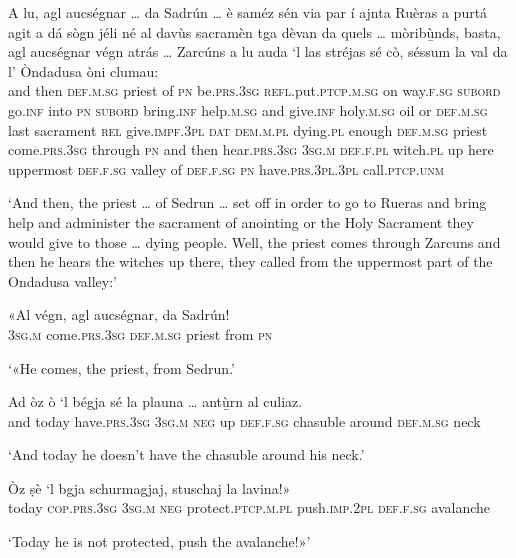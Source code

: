 \begin{linenumbers}
\gll    A lu, agl aucségnar … da Sadrún … è saméz sén via par í ajnta Ruèras a purtá agit a dá sògn jéli né al davùs sacramèn tga dèvan da quels … mòribù̱nds, basta, agl aucségnar végn atrás … Zarcúns a lu auda `l las stréjas sé cò, séssum la val da l' Òndadusa òni clumau:\\
and then \textsc{def.m.sg} priest {} of \textsc{pn} {} be.\textsc{prs.3sg} \textsc{refl.}put.\textsc{ptcp.m.sg} on way.\textsc{f.sg} \textsc{subord} go.\textsc{inf} into \textsc{pn}  \textsc{subord} bring.\textsc{inf} help.\textsc{m.sg} and give.\textsc{inf} holy.\textsc{m.sg} oil or \textsc{def.m.sg} last sacrament \textsc{rel} give.\textsc{impf.3pl} \textsc{dat} \textsc{dem.m.pl} {} dying.\textsc{pl} enough \textsc{def.m.sg} priest come.\textsc{prs.3sg} through {} \textsc{pn} and then hear.\textsc{prs.3sg} \textsc{3sg.m} \textsc{def.f.pl} witch.\textsc{pl} up here uppermost \textsc{def.f.sg} valley of \textsc{def.f.sg}  \textsc{pn} have.\textsc{prs.3pl.3pl} call.\textsc{ptcp.unm}\\
\end{linenumbers}
\medskip
\glt `And then, the priest … of Sedrun … set off in order to go to Rueras and bring help and administer the sacrament of anointing or the Holy Sacrament they would give to those … dying people. Well, the priest comes through Zarcuns and then he hears the witches up there, they called from the uppermost part of the Ondadusa valley:'
\medskip

\begin{linenumbers}
\gll  «Al végn, agl aucségnar, da Sadrún! \\
 \textsc{3sg.m} come.\textsc{prs.3sg} \textsc{def.m.sg} priest from \textsc{pn}\\
\end{linenumbers}
\medskip
\glt `«He comes, the priest, from Sedrun.'
\medskip

\begin{linenumbers}
\gll    Ad òz ò `l bégja sé la plauna … antù̱rn al culiaz.\\
and today have.\textsc{prs.3sg} \textsc{3sg.m} \textsc{neg} up \textsc{def.f.sg} chasuble {} around \textsc{def.m.sg} neck\\
\end{linenumbers}
\medskip
\glt `And today he doesn’t have the chasuble around his neck.'
\medskip

\begin{linenumbers}
\gll  Òz ṣè `l bgja schurmagjaj,\footnotemark {} stuschaj la lavina!» \\
today \textsc{cop.prs.3sg} \textsc{3sg.m} \textsc{neg} protect.\textsc{ptcp.m.pl} push.\textsc{imp.2pl} \textsc{def.f.sg} avalanche \\
\end{linenumbers}
\medskip
\glt `Today he is not protected, push the avalanche!»'
\medskip

